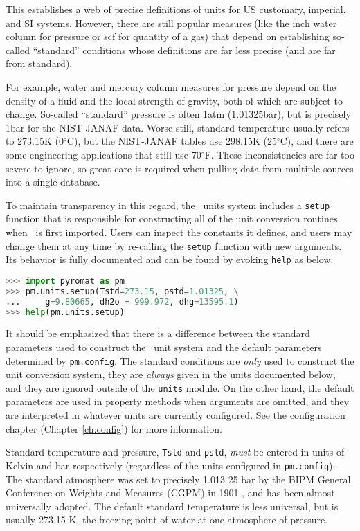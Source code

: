 This establishes a web of precise definitions of units for US customary, imperial, and SI systems.  However, there are still popular measures (like the inch water column for pressure or scf for quantity of a gas) that depend on establishing so-called ``standard'' conditions whose definitions are far less precise (and are far from standard).  

For example, water and mercury column measures for pressure depend on the density of a fluid and the local strength of gravity, both of which are subject to change.  So-called ``standard'' pressure is often 1atm (1.01325bar), but is precisely 1bar for the NIST-JANAF data.  Worse still, standard temperature usually refers to 273.15K (0$^\circ$C), but the NIST-JANAF tables use 298.15K (25$^\circ$C), and there are some engineering applications that still use 70$^\circ$F.  These inconsistencies are far too severe to ignore, so great care is required when pulling data from multiple sources into a single database.

To maintain transparency in this regard, the \PM\ units system includes a \verb|setup| function that is responsible for constructing all of the unit conversion routines when \PM\ is first imported.  Users can inspect the constants it defines, and users may change them at any time by re-calling the \verb|setup| function with new arguments.  Its behavior is fully documented and can be found by evoking \verb|help| as below.

\begin{lstlisting}[language=Python]
>>> import pyromat as pm
>>> pm.units.setup(Tstd=273.15, pstd=1.01325, \
...     g=9.80665, dh2o = 999.972, dhg=13595.1)
>>> help(pm.units.setup)
\end{lstlisting}

It should be emphasized that there is a difference between the standard parameters used to construct the \PM\ unit system and the default parameters determined by \verb|pm.config|.  The standard conditions are \emph{only} used to construct the unit conversion system, they are \emph{always} given in the units documented below, and they are ignored outside of the \verb|units| module.  On the other hand, the default parameters are used in property methods when arguments are omitted, and they are interpreted in whatever units are currently configured.  See the configuration chapter (Chapter \ref{ch:config}) for more information.

Standard temperature and pressure, \verb|Tstd| and \verb|pstd|, \emph{must} be entered in units of Kelvin and bar respectively (regardless of the units configured in \verb|pm.config|).  The standard atmosphere was set to precisely 1.013 25 bar by the BIPM General Conference on Weights and Measures (CGPM) in 1901 \cite{cgpm:3:2}, and has been almost universally adopted.  The default standard temperature is less universal, but is usually 273.15 K, the freezing point of water at one atmosphere of pressure.

